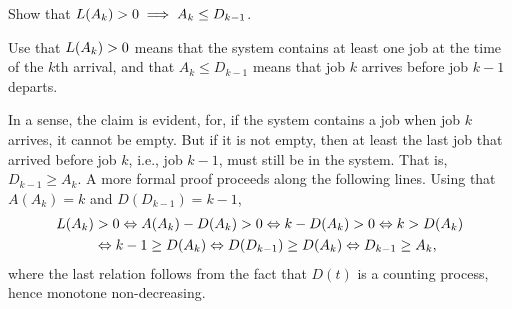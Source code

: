 \begin{exercise}
Show  that $L(A_k)>0 \implies A_k \leq D_{k-1}$.
\begin{hint} Use that $L(A_k)>0$ means that the system contains at least one job at the time of the $k$th arrival, and that $A_k \leq D_{k-1}$ means that job $k$ arrives before job $k-1$ departs.
\end{hint}
\begin{solution} In a sense, the claim is evident, for, if the system contains a job when job $k$ arrives, it cannot be empty.
 But if it is not empty, then at least the last job that arrived before job $k$, i.e., job $k-1$, must still be in the system.
 That is, $D_{k-1} \geq A_k$.
 A more formal proof proceeds along the following lines.
 Using that $A(A_k) = k$ and $D(D_{k-1})= k-1$,
 \begin{equation*}
 \begin{split}
 L(A_k) &> 0 \Leftrightarrow A(A_k) - D(A_k) > 0 \Leftrightarrow k - D(A_k) > 0 \Leftrightarrow k > D(A_k) \\
 &\Leftrightarrow k-1 \geq D(A_k) \Leftrightarrow D(D_{k-1}) \geq D(A_k) \Leftrightarrow D_{k-1} \geq A_k,
 \end{split}
 \end{equation*}
 where the last relation follows from the fact that $D(t)$ is a
 counting process, hence monotone non-decreasing.
\end{solution}
\end{exercise}



